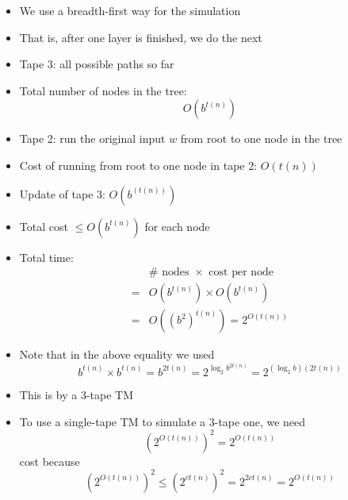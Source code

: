 \begin{frame}[allowframebreaks]
\begin{itemize}
\item We use a breadth-first way for the simulation
\item That is, after one layer is finished, we do the next

\item Tape 3: all possible paths so far

\item Total number of nodes in the tree:
\begin{equation*}
  O(b^{t(n)})
\end{equation*}

\item Tape 2: run the original input $w$ from root to one node in the
  tree

\item Cost of running from root to one node in tape 2: $O(t(n))$

\item Update of tape 3: $O(b^{(t(n))})$

\item Total cost $\leq O(b^{t(n)})$ for each node
\item Total time:
  \begin{equation*}
    \begin{split}
& \# \text{ nodes } \times \text{ cost per node}\\      
= &   O(b^{t(n)}) \times O(b^{t(n)}) \\
= & O((b^2)^{t(n)} ) = 2^{O(t(n))}
\end{split}
\end{equation*}
\item Note that in the above equality we used
  \begin{equation*}
    b^{t(n)} \times b^{t(n)}
    = b^{2t(n)} =
    2^{\log_2 b^{2t(n)}} = 2^{(\log_2 b)(2 t(n))}
  \end{equation*}

\item This is by a 3-tape TM
\item To use a single-tape TM to simulate a 3-tape one, we need
  \begin{equation*}
(2^{O(t(n))})^2
= 2^{O(t(n))}
\end{equation*}
cost because
\begin{equation*}
  (2^{O(t(n))})^2
\leq (2^{ct(n)})^2
= 2^{2ct(n)} 
= 2^{O(t(n))}
\end{equation*}
\end{itemize}\end{frame}


